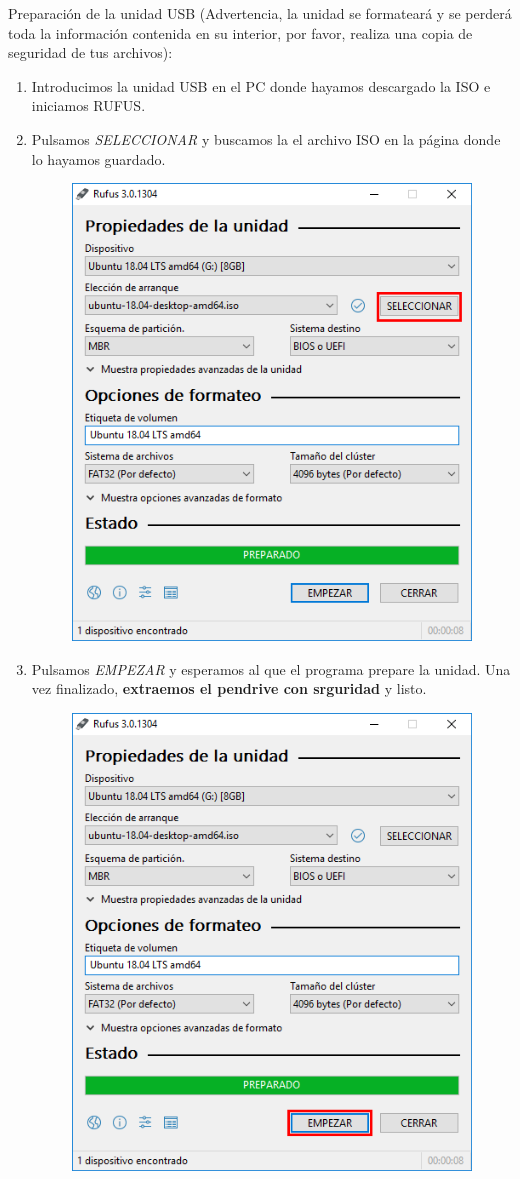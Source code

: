 \noindent Preparación de la unidad USB (Advertencia, la unidad se formateará y se perderá toda la información contenida en su interior, por favor, realiza una copia de seguridad de tus archivos):
\begin{enumerate}
    \item Introducimos la unidad USB en el PC donde hayamos descargado la ISO e iniciamos RUFUS.
    \item Pulsamos \textit{SELECCIONAR} y buscamos la el archivo ISO en la página donde lo hayamos guardado.
    \begin{figure}[H]
        \centering
        \includegraphics[width= 0.4 \textwidth]{Media/rufus_es_ISO.png}
    \end{figure}
    \newpage
    \item Pulsamos \textit{EMPEZAR} y esperamos al que el programa prepare la unidad. Una vez finalizado, \textbf{extraemos el pendrive con srguridad} y listo.
    \begin{figure}[H]
        \centering
        \includegraphics[width= 0.4 \textwidth]{Media/rufus_es_empezar.png}
    \end{figure}
\end{enumerate}

